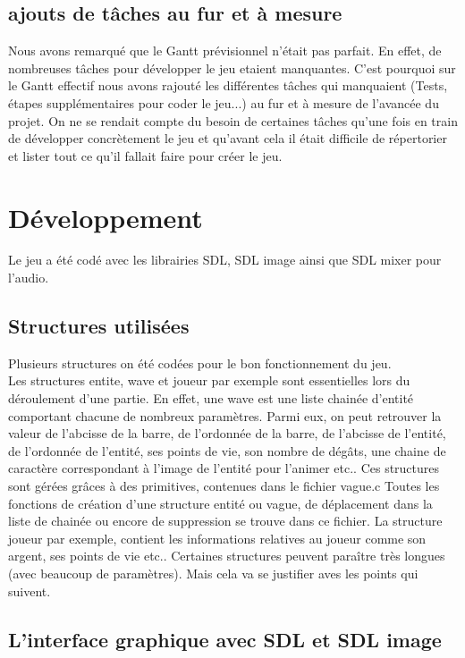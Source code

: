 \documentclass[a4paper,11pt]{article}
\begin{document}
\subsection{ajouts de tâches au fur et à mesure}
Nous avons remarqué que le Gantt prévisionnel n'était pas parfait. En effet, de nombreuses
tâches pour développer le jeu etaient manquantes. C'est pourquoi sur le Gantt effectif nous avons rajouté les différentes tâches
qui manquaient (Tests, étapes supplémentaires pour coder le jeu...) au fur et à mesure de l'avancée du projet. On ne se rendait compte du besoin de certaines
tâches qu'une fois en train de développer concrètement le jeu et qu'avant cela il était difficile de répertorier et lister tout ce qu'il fallait faire
pour créer le jeu.\\

\section{Développement}
Le jeu a été codé avec les librairies SDL, SDL image ainsi que SDL mixer pour l'audio.
\subsection{Structures utilisées}
Plusieurs structures on été codées pour le bon fonctionnement du jeu.\\ Les structures entite, wave et joueur par exemple
sont essentielles lors du déroulement d'une partie. En effet, une wave est une liste chainée d'entité comportant chacune
de nombreux paramètres. Parmi eux, on peut retrouver la valeur de l'abcisse de la barre, de l'ordonnée de la barre, de l'abcisse de l'entité, 
de l'ordonnée de l'entité, ses points de vie, son nombre de dégâts, une chaine de caractère correspondant à l'image de l'entité pour l'animer etc..
Ces structures sont gérées grâces à des primitives, contenues dans le fichier vague.c
Toutes les fonctions de création d'une structure entité ou vague, de déplacement dans la liste de chainée ou encore de suppression
se trouve dans ce fichier.
La structure joueur par exemple, contient les informations relatives au joueur comme son argent, ses points de vie etc..
Certaines structures peuvent paraître très longues (avec beaucoup de paramètres). Mais cela va se justifier aves les points qui suivent.
\subsection{L'interface graphique avec SDL et SDL image}
\end{document}
